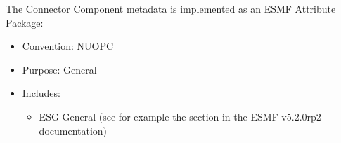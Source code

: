 \label{ConnectorCompMeta}
The Connector Component metadata is implemented as an ESMF Attribute Package:

\begin{itemize}
    \item Convention: NUOPC
    \item Purpose: General
    \item Includes:
    \begin{itemize}
        \item ESG General (see for example the  section in the ESMF v5.2.0rp2 documentation)
    \end{itemize} 
\end{itemize}

